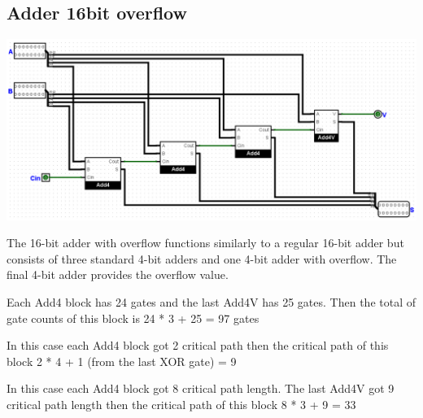 \documentclass{article}
\begin{document}
\subsection{Adder 16bit overflow}
\begin{center}
    \includegraphics[width=1\textwidth]{images/Add16V.png}
\end{center}
\hspace*{2em} The 16-bit adder with overflow functions similarly to a regular 16-bit adder but consists of three standard 4-bit adders and one 4-bit adder with overflow. The final 4-bit adder provides the overflow value.

\hspace{2em}Each Add4 block has 24 gates and the last Add4V has 25 gates. Then the total of gate counts of this block is 24 * 3 + 25 = 97 gates

\hspace{2em}In this case each Add4 block got 2 critical path then the critical path of this block 2 * 4 + 1 (from the last XOR gate) = 9

\hspace{2em}In this case each Add4 block got 8 critical path length. The last Add4V got 9 critical path length then the critical path of this block 8 * 3 + 9 = 33
\end{document}
